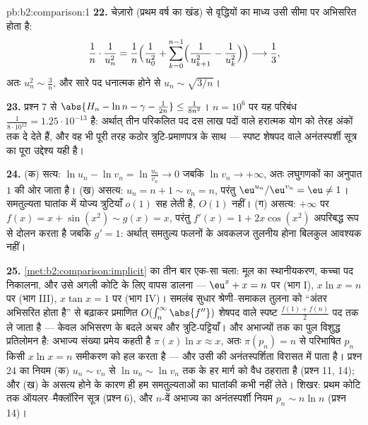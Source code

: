 \begin{solution}{pb:b2:comparison:1}
\textbf{22.} चेज़ारो (प्रथम वर्ष का खंड) से वृद्धियों का माध्य उसी सीमा
पर अभिसरित होता है:
\[
\frac{1}{n}\cdot\frac{1}{u_n^2}
= \frac1n\Bigl(\frac1{u_0^2} + \sum_{k=0}^{n-1}
\Bigl(\frac1{u_{k+1}^2} - \frac1{u_k^2}\Bigr)\Bigr)
\longrightarrow \frac13 ,
\]
अतः $u_n^2 \sim \frac3n$, और सारे पद धनात्मक होने से $u_n
\sim \sqrt{3/n}$।

\textbf{23.} प्रश्न 7 से $\abs{H_n - \ln n - \gamma -
\frac1{2n}} \leq \frac1{8n^2}$। $n = 10^6$ पर यह परिबंध $\frac{1}{8\cdot10^{12}} = 1.25\cdot10^{-13}$ है: अर्थात् तीन
परिकलित पद दस लाख पदों वाले हरात्मक योग को तेरह अंकों तक दे देते हैं,
और वह भी पूरी तरह कठोर त्रुटि-प्रमाणपत्र के साथ --- स्पष्ट शेषपद वाले
अनंतस्पर्शी सूत्र का पूरा उद्देश्य यही है।

\textbf{24.} (क) सत्य: $\ln u_n - \ln v_n = \ln\frac{u_n}{v_n}
\to 0$ जबकि $\ln v_n \to +\infty$, अतः लघुगणकों का अनुपात $1$ की ओर
जाता है। (ख) असत्य: $u_n = n + 1 \sim v_n = n$, परंतु $\eu^{u_n}/\eu^{v_n} = \eu \neq 1$। समतुल्यता घातांक में योज्य
त्रुटियाँ $o(1)$ सह लेती है, $O(1)$ नहीं। (ग) असत्य: $+\infty$ पर $f(x) = x + \sin(x^2) \sim g(x) = x$, परंतु $f'(x)
= 1 + 2x\cos(x^2)$
अपरिबद्ध रूप से दोलन करता है जबकि $g' = 1$: अर्थात् समतुल्य फलनों के अवकलज
तुलनीय होना बिलकुल आवश्यक नहीं।

\textbf{25.} \cref{met:b2:comparison:implicit} का  तीन बार एक-सा चला: मूल का स्थानीयकरण, कच्चा पद
निकालना, और उसे अगली कोटि के लिए वापस डालना --- $\eu^x + x = n$ पर (भाग I), $x\ln x = n$ पर
(भाग III), $x\tan x = 1$ पर (भाग IV)। समलंब सुधार श्रेणी--समाकल तुलना को ``अंतर
अभिसरित होता है'' से बढ़ाकर प्रमाणित $O(\int_n^\infty
\abs{f''})$ शेषपद वाले स्पष्ट $\frac{f(1) + f(n)}2$ पद तक ले
जाता है --- केवल अभिसरण के बदले अचर और त्रुटि-पट्टियाँ। और अभाज्यों तक
का पुल विशुद्ध प्रतिलोमन है: अभाज्य संख्या प्रमेय कहती है $\pi(x)\ln x \approx x$, अतः $\pi(p_n) = n$
से परिभाषित $p_n$ किसी $x\ln x = n$ समीकरण को हल करता है --- और उसी की
अनंतस्पर्शिता विरासत में पाता है। प्रश्न 24 का नियम (क) $u_n \sim v_n$ से $\ln u_n \sim
\ln v_n$ तक
के हर मार्ग को वैध ठहराता है (प्रश्न 11, 14); और (ख) के असत्य होने के
कारण ही हम समतुल्यताओं का घातांकी कभी नहीं लेते। शिखर: प्रथम कोटि तक
ऑयलर--मैक्लॉरिन सूत्र (प्रश्न 6), और $n$-वें अभाज्य का अनंतस्पर्शी
नियम $p_n \sim n\ln n$ (प्रश्न 14)।
\end{solution}

